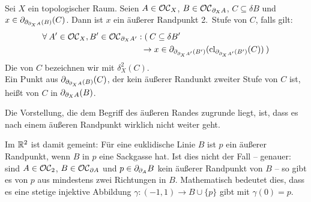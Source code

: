     \begin{dfn}\label{def:aeusserer-rand-2} \ \vspace{8pt}

        \noindent
        Sei $X$ ein topologischer Raum.
        Seien $A \in \mathcal{OC}_X$, $B \in \mathcal{OC}_{\partial_X A}$, $C \subseteq \delta B$ und $x \in \partial_{\partial_{\partial_X A}(B)}(C)$. Dann ist $x$ ein äußerer Randpunkt 2.~Stufe von $C$, falls gilt:
        \begin{align*}
            &\forall\: A' \in \mathcal{OC}_X, B' \in \mathcal{OC}_{\partial_X A'} : (\: C \subseteq \delta B'\\
            &\hphantom{XXXXXXXXXXXXX} \to x \in \partial_{\partial_{\partial_X A'}(B')}(\text{cl}_{\partial_{\partial_X A'}(B')} (C)) \:)
        \end{align*}
        Die  von $C$ bezeichnen wir mit $\delta_X^2(C)$.\\
        Ein Punkt aus $\partial_{\partial_{\partial_X A}(B)}(C)$, der kein äußerer Randunkt zweiter Stufe von $C$ ist, heißt  von $C$ in $\partial_{\partial_X A}(B)$.
    \end{dfn}
    
    Die Vorstellung, die dem Begriff des äußeren Randes zugrunde liegt, ist, dass es nach einem äußeren Randpunkt \glqq wirklich nicht weiter geht\grqq.
    

    Im
    $\mathbb{R}^2$ ist damit gemeint:
    Für eine euklidische Linie $B$ ist $p$ ein äußerer Randpunkt, wenn $B$ in $p$ eine Sackgasse hat.
    Ist dies nicht der Fall -- genauer: sind $A \in \mathcal{OC}_2$, $B \in \mathcal{OC}_{\partial A}$ und $p \in \partial_{\partial_A} B$ kein äußerer Randpunkt von $B$ -- so gibt es von $p$ aus mindestens zwei Richtungen in $B$.
    Mathematisch bedeutet dies, dass es eine stetige injektive Abbildung $\gamma:(-1,1) \to B \cup \{p\}$ gibt mit $\gamma(0) = p$.

